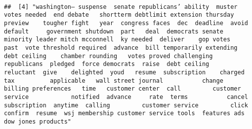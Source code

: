 \documentclass[
]{article}
\begin{document}
\begin{verbatim}
                                                                                                                                                                                                                                                                                                                                                                                                                                                                   
##  [4] "washington— suspense  senate republicans’ ability  muster  votes needed  end debate   shortterm debtlimit extension thursday   preview    tougher fight   year  congress faces  dec  deadline  avoid default     government shutdown  part   deal  democrats senate minority leader mitch mcconnell  ky needed  deliver    gop votes   past  vote threshold required  advance  bill temporarily extending  debt ceiling    chamber rounding   votes proved challenging  republicans  pledged  force democrats  raise  debt ceiling    reluctant  give    delighted  youd   resume  subscription    charged           tax          applicable   wall street journal           change  billing preferences   time   customer center  call         customer service            notified  advance     rate  terms           cancel  subscription  anytime  calling         customer service         click confirm  resume  wsj membership customer service tools  features ads  dow jones products"                                                                                                                                                                                                                                                                                                                                                                                                                                                                                                                                                                                                                                                                                                                                                                                                                                                                                                                                                                                                                                                                                                                                                                                                                                                                                                                                                                                                                                                                                                                                                                                                                                                                                                                                                                                                                                                                                                                                                                           
\end{verbatim}
\end{document}
